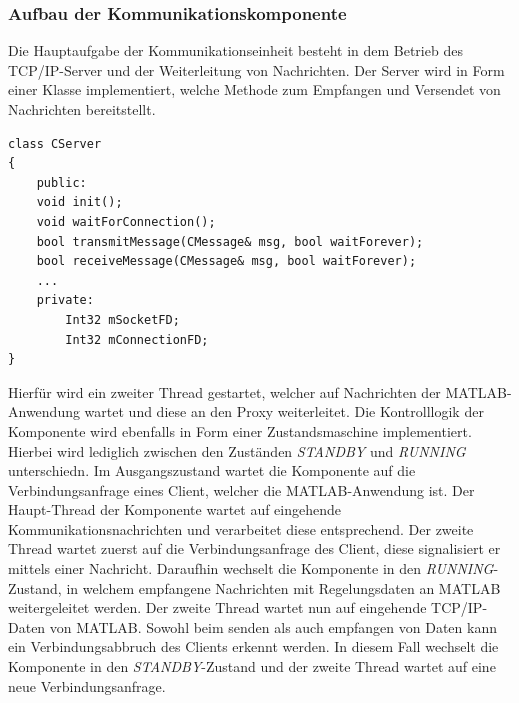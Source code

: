 \documentclass{article}
\begin{document}
\subsubsection{Aufbau der Kommunikationskomponente}
Die Hauptaufgabe der Kommunikationseinheit besteht in dem Betrieb des TCP/IP-Server und der Weiterleitung von Nachrichten. Der Server wird in Form einer Klasse implementiert, welche Methode zum Empfangen und Versendet von Nachrichten bereitstellt. 

\begin{lstlisting}
class CServer
{
	public:
	void init();
	void waitForConnection();
	bool transmitMessage(CMessage& msg, bool waitForever);
	bool receiveMessage(CMessage& msg, bool waitForever);
	...
	private:
		Int32 mSocketFD;
		Int32 mConnectionFD;
}
\end{lstlisting}

Hierfür wird ein zweiter Thread gestartet, welcher auf Nachrichten der MATLAB-Anwendung wartet und diese an den Proxy weiterleitet. Die Kontrolllogik der Komponente wird ebenfalls in Form einer Zustandsmaschine implementiert. Hierbei wird lediglich zwischen den Zuständen \textit{STANDBY} und \textit{RUNNING} unterschiedn. Im Ausgangszustand wartet die Komponente auf die Verbindungsanfrage eines Client, welcher die MATLAB-Anwendung ist. Der Haupt-Thread der Komponente wartet auf eingehende Kommunikationsnachrichten und verarbeitet diese entsprechend. Der zweite Thread wartet zuerst auf die Verbindungsanfrage des Client, diese signalisiert er mittels einer Nachricht. Daraufhin wechselt die Komponente in den \textit{RUNNING}-Zustand, in welchem empfangene Nachrichten mit Regelungsdaten an MATLAB weitergeleitet werden. Der zweite Thread wartet nun auf eingehende TCP/IP-Daten von MATLAB. Sowohl beim senden als auch empfangen von Daten kann ein Verbindungsabbruch des Clients erkennt werden. In diesem Fall wechselt die Komponente in den \textit{STANDBY}-Zustand und der zweite Thread wartet auf eine neue Verbindungsanfrage.
\end{document}
